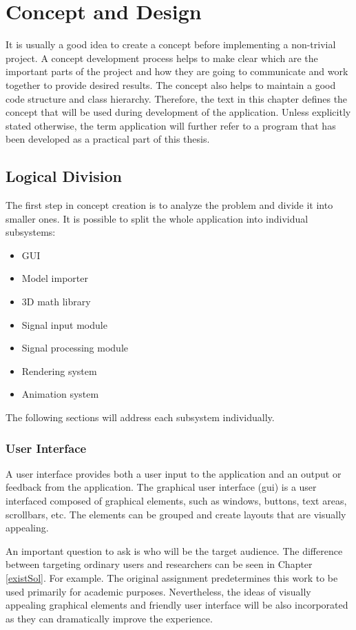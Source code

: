 \chapter{Concept and Design} \label{concept}
It is usually a good idea to create a concept before implementing a non-trivial project. A concept development process helps to make clear which are the important parts of the project and how they are going to communicate and work together to provide desired results. The concept also helps to maintain a good code structure and class hierarchy. Therefore, the text in this chapter defines the concept that will be used during development of the application. Unless explicitly stated otherwise, the term application will further refer to a program that has been developed as a practical part of this thesis. 

\section{Logical Division}
The first step in concept creation is to analyze the problem and divide it into smaller ones. It is possible to split the whole application into individual subsystems:
\begin{itemize}
	\item GUI
	\item Model importer
	\item 3D math library 
	\item Signal input module
	\item Signal processing module
	\item Rendering system
	\item Animation system
\end{itemize}

The following sections will address each subsystem individually.
\subsection{User Interface}
A user interface provides both a user input to the application and an output or feedback from the application. The graphical user interface (\gls{gui}) is a user interfaced composed of graphical elements, such as windows, buttons, text areas, scrollbars, etc. The elements can be grouped and create layouts that are visually appealing. 

An important question to ask is who will be the target audience. The difference between targeting ordinary users and researchers can be seen in Chapter \ref{existSol}. For example. The original assignment predetermines this work to be used primarily for academic purposes. Nevertheless, the ideas of visually appealing graphical elements and friendly user interface will be also incorporated as they can dramatically improve the experience.

